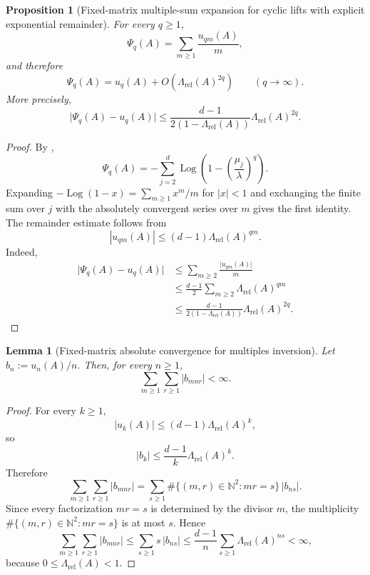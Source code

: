\documentclass[11pt,a4paper]{amsart}
\theoremstyle{plain}
\newtheorem{proposition}[theorem]{Proposition}
\newtheorem{lemma}[theorem]{Lemma}
\theoremstyle{definition}
\theoremstyle{remark}
\DeclareMathOperator{\Log}{Log}
\newcommand{\NN}{\mathbb{N}}
\newcommand{\abs}[1]{\lvert #1 \rvert}
\begin{document}
\begin{proposition}[Fixed-matrix multiple-sum expansion for
  cyclic lifts with explicit exponential remainder]
  \label{prop:finite-part-cyclic-lift-dirichlet-multiple-sum}
  For every \(q\ge 1\),
  \[
    \Psi_q(A)=\sum_{m\ge 1}\frac{u_{qm}(A)}{m},
  \]
  and therefore
  \[
    \Psi_q(A)=u_q(A)+O\!\left(\Lambda_{\mathrm{rel}}(A)^{2q}\right)
    \qquad (q\to\infty).
  \]
  More precisely,
  \[
    \abs{\Psi_q(A)-u_q(A)}
    \le
    \frac{d-1}{2(1-\Lambda_{\mathrm{rel}}(A))}
    \Lambda_{\mathrm{rel}}(A)^{2q}.
  \]
\end{proposition}

\begin{proof}
  By ,
  \[
    \Psi_q(A)
    =-\sum_{j=2}^d\Log\!\left(1-\left(\frac{\mu_j}{\lambda}\right)^q\right).
  \]
  Expanding \(-\Log(1-x)=\sum_{m\ge 1}x^m/m\) for \(|x|<1\) and
  exchanging the finite sum over \(j\) with the absolutely convergent
  series over \(m\) gives the first identity. The remainder estimate
  follows from
  \[
    |u_{qm}(A)|\le (d-1)\Lambda_{\mathrm{rel}}(A)^{qm}.
  \]
  Indeed,
  \[
    \begin{aligned}
      \abs{\Psi_q(A)-u_q(A)}
      &\le
      \sum_{m\ge 2}\frac{\abs{u_{qm}(A)}}{m} \\
      &\le
      \frac{d-1}{2}\sum_{m\ge 2}\Lambda_{\mathrm{rel}}(A)^{qm} \\
      &\le
      \frac{d-1}{2(1-\Lambda_{\mathrm{rel}}(A))}
      \Lambda_{\mathrm{rel}}(A)^{2q}.
    \end{aligned}
  \]
\end{proof}

\begin{lemma}[Fixed-matrix absolute convergence for multiples
  inversion]
  \label{lem:finite-part-cyclic-lift-mobius-absolute}
  Let \(b_n:=u_n(A)/n\). Then, for every \(n\ge 1\),
  \[
    \sum_{m\ge 1}\sum_{r\ge 1}\abs{b_{mnr}}<\infty.
  \]
\end{lemma}

\begin{proof}
  For every \(k\ge 1\),
  \[
    \abs{u_k(A)}
    \le (d-1)\Lambda_{\mathrm{rel}}(A)^k,
  \]
  so
  \[
    \abs{b_k}
    \le \frac{d-1}{k}\Lambda_{\mathrm{rel}}(A)^k.
  \]
  Therefore
  \[
    \sum_{m\ge 1}\sum_{r\ge 1}\abs{b_{mnr}}
    =
    \sum_{s\ge 1}
      \#\{(m,r)\in \NN^2:mr=s\}\,\abs{b_{ns}}.
  \]
  Since every factorization \(mr=s\) is determined by the divisor \(m\),
  the multiplicity \(\#\{(m,r)\in \NN^2:mr=s\}\) is at most \(s\). Hence
  \[
    \sum_{m\ge 1}\sum_{r\ge 1}\abs{b_{mnr}}
    \le
    \sum_{s\ge 1}s\,\abs{b_{ns}}
    \le
    \frac{d-1}{n}\sum_{s\ge 1}\Lambda_{\mathrm{rel}}(A)^{ns}
    <\infty,
  \]
  because \(0\le \Lambda_{\mathrm{rel}}(A)<1\).
\end{proof}
\end{document}
